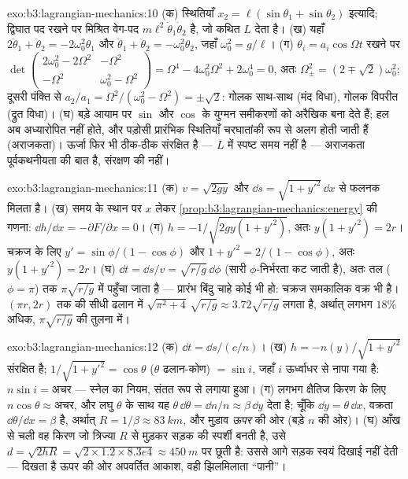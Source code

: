 \begin{solution}{exo:b3:lagrangian-mechanics:10}
(क) स्थितियाँ $x_2 = \ell(\sin\theta_1 + \sin\theta_2)$ इत्यादि; द्विघात
पद रखने पर मिश्रित वेग-पद
$m\ell^2\dot\theta_1\dot\theta_2$ है, जो कथित $L$ देता है। (ख) यहाँ
$2\ddot\theta_1 + \ddot\theta_2 = -2\omega_0^2\theta_1$ और
$\ddot\theta_1 + \ddot\theta_2 = -\omega_0^2\theta_2$, जहाँ $\omega_0^2
= g/\ell$। (ग) $\theta_i = a_i\cos\Omega t$ रखने पर
$\det\begin{pmatrix} 2\omega_0^2 - 2\Omega^2 & -\Omega^2\\ -\Omega^2 &
\omega_0^2 - \Omega^2\end{pmatrix} = \Omega^4 - 4\omega_0^2\Omega^2 +
2\omega_0^4 = 0$, अतः $\Omega_\pm^2 = (2 \mp \sqrt2)\omega_0^2$; दूसरी
पंक्ति से $a_2/a_1 = \Omega^2/(\omega_0^2 - \Omega^2) =
\pm\sqrt2$: गोलक साथ-साथ (मंद विधा), गोलक विपरीत (द्रुत विधा)। (घ)
बड़े आयाम पर $\sin$ और $\cos$ के युग्मन समीकरणों को अरैखिक बना देते
हैं; हल अब अध्यारोपित नहीं होते, और पड़ोसी प्रारंभिक स्थितियाँ चरघातांकी
रूप से अलग होती जाती हैं (अराजकता)। ऊर्जा फिर भी ठीक-ठीक संरक्षित है
--- $L$ में स्पष्ट समय नहीं है --- अराजकता पूर्वकथनीयता की बात है,
संरक्षण की नहीं।
\end{solution}

\begin{solution}{exo:b3:lagrangian-mechanics:11}
(क) $v = \sqrt{2gy}$ और $\dd s = \sqrt{1 + y'^2}\,\dd x$ से फलनक मिलता
है। (ख) समय के स्थान पर $x$ लेकर
\cref{prop:b3:lagrangian-mechanics:energy} की गणना: $\dd
h/\dd x = -\partial F/\partial x = 0$। (ग) $h = -1/\sqrt{2gy(1 +
y'^2)}$, अतः $y(1 + y'^2) = 2r$। चक्रज के लिए $y' =
\sin\phi/(1 - \cos\phi)$ और $1 + y'^2 = 2/(1 - \cos\phi)$, अतः
$y(1 + y'^2) = 2r$। (घ) $\dd t = \dd s/v = \sqrt{r/g}\,\dd\phi$ (सारी
$\phi$-निर्भरता कट जाती है), अतः तल ($\phi = \pi$) तक
$\pi\sqrt{r/g}$ में पहुँचा जाता है --- प्रारंभ बिंदु चाहे कोई भी हो:
चक्रज समकालिक वक्र भी है। $(\pi r, 2r)$ तक की सीधी ढलान में $\sqrt{\pi^2
+ 4}\,\sqrt{r/g} \approx 3.72\sqrt{r/g}$ लगता है, अर्थात् लगभग $18\%$
अधिक, $\pi\sqrt{r/g}$ की तुलना में।
\end{solution}

\begin{solution}{exo:b3:lagrangian-mechanics:12}
(क) $\dd t = \dd s/(c/n)$। (ख) $h = -n(y)/\sqrt{1 + y'^2}$
संरक्षित है; $1/\sqrt{1 + y'^2} = \cos\theta$ ($\theta$ ढलान-कोण)
$= \sin i$, जहाँ $i$ ऊर्ध्वाधर से नापा गया है: $n\sin i = \text{अचर}$ ---
स्नेल का नियम, संतत रूप से लगाया हुआ। (ग) लगभग क्षैतिज किरण के लिए
$n\cos\theta \approx \text{अचर}$, और लघु $\theta$ के साथ यह
$\theta\,\dd\theta = \dd n/n \approx \beta\,\dd y$ देता है; चूँकि $\dd y =
\theta\,\dd x$, वक्रता $\dd\theta/\dd x = \beta$ है, अर्थात् $R =
1/\beta \approx \qty{83}{km}$, और मुड़ाव \emph{ऊपर} की ओर (बड़े
$n$ की ओर)। (घ) आँख से चली वह किरण जो त्रिज्या $R$ से मुड़कर सड़क की
स्पर्शी बनती है, उसे $d = \sqrt{2hR} = \sqrt{2 \times 1.2 \times
8.3e4} \approx \qty{450}{m}$ पर छूती है: उससे आगे सड़क स्वयं
दिखाई नहीं देती --- दिखता है ऊपर की ओर अपवर्तित आकाश, वही झिलमिलाता ``पानी''।
\end{solution}

